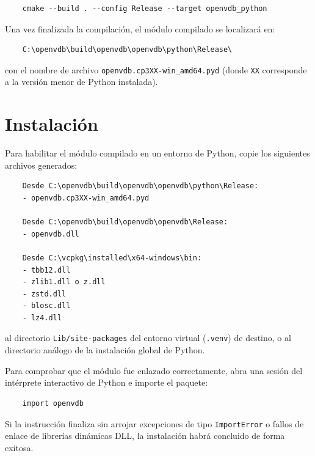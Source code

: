 \begin{verbatim}
    cmake --build . --config Release --target openvdb_python
\end{verbatim}

Una vez finalizada la compilación, el módulo compilado se localizará en:

\begin{verbatim}
    C:\openvdb\build\openvdb\openvdb\python\Release\
\end{verbatim}
con el nombre de archivo \texttt{openvdb.cp3XX-win\_amd64.pyd} 
(donde \texttt{XX} corresponde a la versión menor de Python instalada).

\section{Instalación}
Para habilitar el módulo compilado en un entorno de Python, copie los siguientes archivos 
generados:

\begin{verbatim}
    Desde C:\openvdb\build\openvdb\openvdb\python\Release:
    - openvdb.cp3XX-win_amd64.pyd

    Desde C:\openvdb\build\openvdb\openvdb\Release:
    - openvdb.dll

    Desde C:\vcpkg\installed\x64-windows\bin:
    - tbb12.dll
    - zlib1.dll o z.dll
    - zstd.dll
    - blosc.dll
    - lz4.dll
\end{verbatim}
al directorio \texttt{Lib/site-packages} del entorno virtual (\texttt{.venv}) de destino, 
o al directorio análogo de la instalación global de Python.
\medskip

Para comprobar que el módulo fue enlazado correctamente, abra una sesión del intérprete 
interactivo de Python e importe el paquete:

\begin{verbatim}
    import openvdb
\end{verbatim}
Si la instrucción finaliza sin arrojar excepciones de tipo \texttt{ImportError} o 
fallos de enlace de librerías dinámicas DLL, la instalación habrá concluido de forma exitosa.